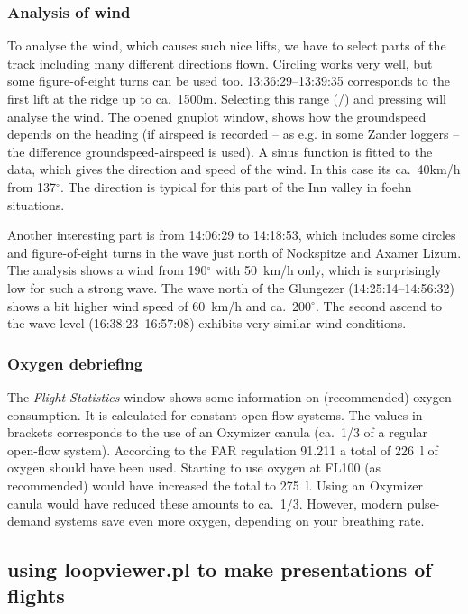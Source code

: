 \subsubsection{Analysis of wind}
To analyse the wind, which causes such nice lifts, we have to select parts of the track including many different directions flown. Circling works very well, but some figure-of-eight turns can be used too.
13:36:29--13:39:35 corresponds to the first lift at the ridge up to ca.~1500m. Selecting this range (/) and pressing  will analyse the wind. The opened gnuplot window, shows how the groundspeed depends on the heading (if airspeed is recorded -- as e.g. in some Zander loggers -- the difference groundspeed-airspeed is used). A sinus function is fitted to the data, which gives the direction and speed of the wind. In this case its ca.~40km/h from 137$^\circ$. The direction is typical for this part of the Inn valley in foehn situations.

Another interesting part is from 14:06:29 to 14:18:53, which includes some circles and figure-of-eight turns in the wave just north of Nockspitze and Axamer Lizum. The analysis shows a wind from 190$^\circ$ with 50~km/h only, which is surprisingly low for such a strong wave.
The wave north of the Glungezer (14:25:14--14:56:32) shows a bit higher wind speed of 60~km/h and ca.~200$^\circ$.
The second ascend to the wave level (16:38:23--16:57:08) exhibits very similar wind conditions.

\subsubsection{Oxygen debriefing}
The \emph{Flight Statistics} window shows some information on (recommended) oxygen consumption. It is calculated for constant open-flow systems. The values in brackets corresponds to the use of an Oxymizer canula (ca.~1/3 of a regular open-flow system).
According to the FAR regulation 91.211 a total of 226~l of oxygen should have been used. Starting to use oxygen at FL100 (as recommended) would have increased the total to 275~l. Using an Oxymizer canula would have reduced these amounts to ca.~1/3.
However, modern pulse-demand systems save even more oxygen, depending on your breathing rate.


\clearpage

\subsection{using loopviewer.pl to make presentations of flights}

